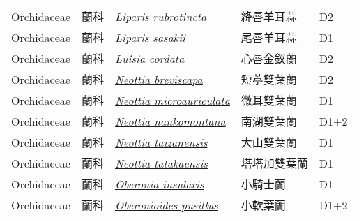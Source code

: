 {\begin{longtable}{p{2.5cm}p{2cm}p{5cm}p{2.5cm}p{3cm}}
    Orchidaceae & 蘭科 & \href{http://www.theplantlist.org/tpl1.1/search?q=Liparis+rubrotincta}{\textit{Liparis rubrotincta} } & 絳唇羊耳蒜 & D2 \index{Liparis@\textit{Liparis}!rubrotincta@\textit{rubrotincta}}  \index{絳唇羊耳蒜} \\
    Orchidaceae & 蘭科 & \href{http://www.theplantlist.org/tpl1.1/search?q=Liparis+sasakii}{\textit{Liparis sasakii} } & 尾唇羊耳蒜 & D1 \index{Liparis@\textit{Liparis}!sasakii@\textit{sasakii}}  \index{尾唇羊耳蒜} \\
    Orchidaceae & 蘭科 & \href{http://www.theplantlist.org/tpl1.1/search?q=Luisia+cordata}{\textit{Luisia cordata} } & 心唇金釵蘭 & D2 \index{Luisia@\textit{Luisia}!cordata@\textit{cordata}}  \index{心唇金釵蘭} \\
    Orchidaceae & 蘭科 & \href{http://www.theplantlist.org/tpl1.1/search?q=Neottia+breviscapa}{\textit{Neottia breviscapa} } & 短葶雙葉蘭 & D2 \index{Neottia@\textit{Neottia}!breviscapa@\textit{breviscapa}}  \index{短葶雙葉蘭} \\
    Orchidaceae & 蘭科 & \href{http://www.theplantlist.org/tpl1.1/search?q=Neottia+microauriculata}{\textit{Neottia microauriculata} } & 微耳雙葉蘭 & D1 \index{Neottia@\textit{Neottia}!microauriculata@\textit{microauriculata}}  \index{微耳雙葉蘭} \\
    Orchidaceae & 蘭科 & \href{http://www.theplantlist.org/tpl1.1/search?q=Neottia+nankomontana}{\textit{Neottia nankomontana} } & 南湖雙葉蘭 & D1+2 \index{Neottia@\textit{Neottia}!nankomontana@\textit{nankomontana}}  \index{南湖雙葉蘭} \\
    Orchidaceae & 蘭科 & \href{http://www.theplantlist.org/tpl1.1/search?q=Neottia+taizanensis}{\textit{Neottia taizanensis} } & 大山雙葉蘭 & D1 \index{Neottia@\textit{Neottia}!taizanensis@\textit{taizanensis}}  \index{大山雙葉蘭} \\
    Orchidaceae & 蘭科 & \href{http://www.theplantlist.org/tpl1.1/search?q=Neottia+tatakaensis}{\textit{Neottia tatakaensis} } & 塔塔加雙葉蘭 & D1 \index{Neottia@\textit{Neottia}!tatakaensis@\textit{tatakaensis}}  \index{塔塔加雙葉蘭} \\
    Orchidaceae & 蘭科 & \href{http://www.theplantlist.org/tpl1.1/search?q=Oberonia+insularis}{\textit{Oberonia insularis} } & 小騎士蘭 & D1 \index{Oberonia@\textit{Oberonia}!insularis@\textit{insularis}}  \index{小騎士蘭} \\
    Orchidaceae & 蘭科 & \href{http://www.theplantlist.org/tpl1.1/search?q=Oberonioides+pusillus}{\textit{Oberonioides pusillus} } & 小軟葉蘭 & D1+2 \index{Oberonioides@\textit{Oberonioides}!pusillus@\textit{pusillus}}  \index{小軟葉蘭} \\

\end{longtable}}
